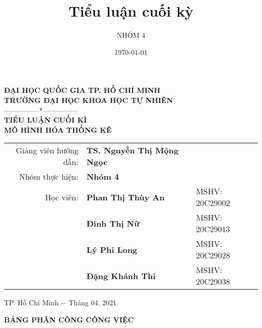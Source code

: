 \documentclass[a4paper]{book}
\title{Tiểu luận cuối kỳ}
\author{NHÓM 4}
\date{\today}%
\begin{document}
	
	\begin{titlepage}
		\thispagestyle{empty}
		\begin{center}
			\textbf{\large{ĐẠI HỌC QUỐC GIA TP. HỒ CHÍ MINH\\TRƯỜNG ĐẠI HỌC KHOA HỌC TỰ NHIÊN}}\\
			---------------*---------------\\
			\vspace*{5.5cm}
			{\textcolor[rgb]{0.0,0.0,1.0}{\textbf{\Large{TIỂU LUẬN CUỐI KÌ}}}}\\
			\vspace{1cm}
			\textbf{\huge{\textcolor[rgb]{1.0,0.0,0.0}{MÔ HÌNH HÓA THỐNG KÊ}}}\\
			\vspace*{4cm}
			\begin{tabular}{rll}
				{Giảng viên hướng dẫn:} &{\bf TS. Nguyễn Thị Mộng Ngọc} &  \\
				{Nhóm thực hiện:}     & {\textbf{Nhóm 4}} & \\
				{Học viên:} & {\textbf{Phan Thị Thùy An}} &{MSHV: 20C29002} \\
				& {\textbf{Đinh Thị Nữ }} &{MSHV: 20C29013} \\
				& {\textbf{Lý Phi Long}} &{MSHV: 20C29028} \\
				& {\textbf{Đặng Khánh Thi}} &{MSHV: 20C29038} 
			\end{tabular}
			\vfill
			\normalsize{TP. Hồ Chí Minh $-$ Tháng 04, 2021}
		\end{center}
	\end{titlepage}
\tableofcontents

\newpage
\thispagestyle{empty}

\begin{center}
	\textbf{\large{BẢNG PHÂN CÔNG CÔNG VIỆC}\\}
\end{center}
\end{document}
